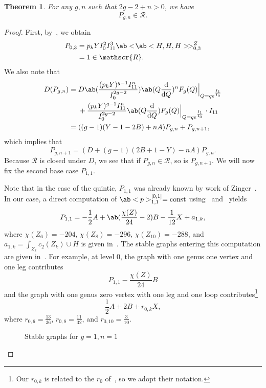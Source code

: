 \documentclass[10pt]{amsart}
\newtheorem{thm}{Theorem}[section]
\theoremstyle{definition}
\theoremstyle{remark}
\theoremstyle{plain}
\theoremstyle{definition}
\theoremstyle{remark}
\newcommand{\msc}[1]{\mathscr{#1}}
\newcommand{\mr}[1]{\mathrm{#1}}
\newcommand{\1}{\mathbf{1}}
\newcommand{\2}{\mathbf{2}}
\newcommand{\3}{\mathbf{3}}
\numberwithin{equation}{section}
\begin{document}
\begin{thm}\label{thm:polynomiality}
    For any $g,n$ such that $2g-2+n > 0$, we have
    \[ P_{g,n} \in \msc{R}. \]
\end{thm}

\begin{proof}
    First, by~, we obtain
    \begin{align*}
        P_{0,3} &= p_k Y I_0^2 I_{11}^3 \ab<\!\ab<H,H,H>\!>_{0,3}^{Z} \\
        &= 1 \in \msc{R}.
    \end{align*}
    We also note that
    \begin{align*}
        D(P_{g,n}) ={}& D\ab(\frac{(p_k Y)^{g-1}I_{11}^n}{I_0^{2g-2}}) \ab(Q\odv{}{Q})^n F_g(Q)\Big\vert_{Q = qe^{\frac{I_1}{I_0}}} \\ 
        &+ \frac{(p_k Y)^{g-1}I_{11}^n}{I_0^{2g-2}} \ab(Q \odv{}{Q}) F_g(Q)\Big\vert_{Q = qe^{\frac{I_1}{I_0}}} \cdot I_{11} \\
        ={}& ( (g-1)(Y-1-2B)+nA )P_{g,n} + P_{g,n+1},
    \end{align*}
    which implies that
    \[ P_{g,n+1} = (D+(g-1)(2B+1-Y)-nA) P_{g,n}. \]
    Because $\msc{R}$ is closed under $D$, we see that if $P_{g,n} \in \msc{R}$, so is $P_{g,n+1}$. We will now fix the second base case $P_{1,1}$.

    Note that in the case of the quintic, $P_{1,1}$ was already known by work of Zinger~\cite{reducedgenus1}. In our case, a direct computation of $\ab<p>_{1,1}^{[0,1]} = \mr{const}$ using~ and~ yields
    \begin{equation}\label{eqn:p11}
     P_{1,1} = -\frac{1}{2} A + \ab(\frac{\chi(Z)}{24} - 2)B - \frac{1}{12}X + a_{1,k}, 
    \end{equation}
    where $\chi(Z_6) = -204$, $\chi(Z_8) = -296$, $\chi(Z_{10}) = -288$, and $a_{1,k} = \int_{Z_k} c_2(Z_k) \cup H$ is given in~. The stable graphs entering this computation are given in~. For example, at level $0$, the graph with one genus one vertex and one leg contributes
    \[ P_{1,1} - \frac{\chi(Z)}{24}B \]
    and the graph with one genus zero vertex with one leg and one loop contributes\footnote{Our $r_{0,k}$ is related to the $r_0$ of~\cite{hkq}, so we adopt their notation.}
    \[ \frac{1}{2} A + 2B + r_{0,k} X, \]
    where $r_{0,6} = \frac{13}{36}$, $r_{0,8} = \frac{11}{32}$, and $r_{0,10} = \frac{3}{10}$.
    \begin{figure}[htpb]
    \begin{center}
    \end{center}
    \caption{Stable graphs for $g=1, n=1$}%
    \label{fig:03graphloop}
    \end{figure}
    


\end{proof}
\end{document}

